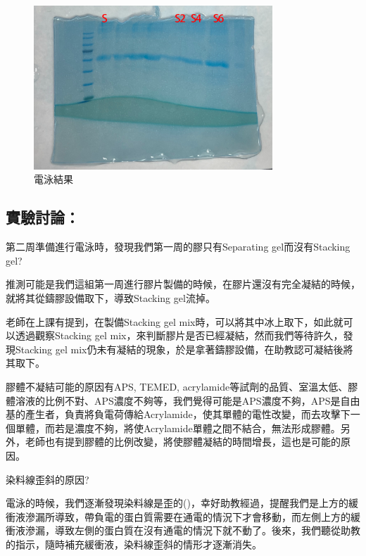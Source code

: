 \begin{figure}[H]
\centering
\includegraphics[width=0.8\textwidth]{paste_src/result.png}
\caption{電泳結果}
\label{fig:result}
\end{figure}



\newpage
\subsection*{實驗討論：}

\dsc 第二周準備進行電泳時，發現我們第一周的膠只有Separating gel而沒有Stacking gel?

推測可能是我們這組第一周進行膠片製備的時候，在膠片還沒有完全凝結的時候，就將其從鑄膠設備取下，導致Stacking gel流掉。

老師在上課有提到，在製備Stacking gel mix時，可以將其中冰上取下，如此就可以透過觀察Stacking gel mix，來判斷膠片是否已經凝結，然而我們等待許久，發現Stacking gel mix仍未有凝結的現象，於是拿著鑄膠設備，在助教認可凝結後將其取下。

膠體不凝結可能的原因有APS, TEMED, acrylamide等試劑的品質、室溫太低、膠體溶液的比例不對、APS濃度不夠等，我們覺得可能是APS濃度不夠，APS是自由基的產生者，負責將負電荷傳給Acrylamide，使其單體的電性改變，而去攻擊下一個單體，而若是濃度不夠，將使Acrylamide單體之間不結合，無法形成膠體。另外，老師也有提到膠體的比例改變，將使膠體凝結的時間增長，這也是可能的原因。 


\dsc 染料線歪斜的原因?

電泳的時候，我們逐漸發現染料線是歪的()，幸好助教經過，提醒我們是上方的緩衝液滲漏所導致，帶負電的蛋白質需要在通電的情況下才會移動，而左側上方的緩衝液滲漏，導致左側的蛋白質在沒有通電的情況下就不動了。後來，我們聽從助教的指示，隨時補充緩衝液，染料線歪斜的情形才逐漸消失。

